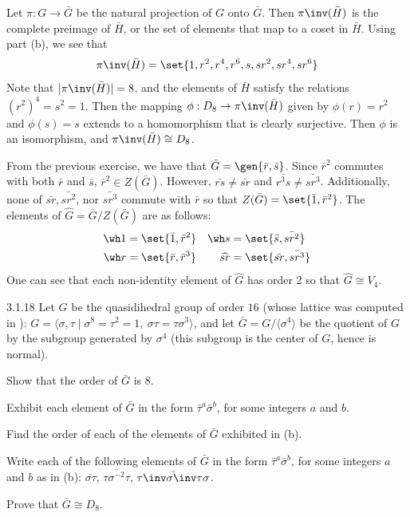 \begin{solenum}
    Let $\pi : G \to \bar G$ be the natural projection of $G$ onto $\bar G$.
	Then $\pi\inv(\bar H)$ is the complete preimage of $\bar H$, or the set of elements that map to a coset in $\bar H$.
	Using part (b), we see that
    \[
    	\pi\inv(\bar H) = \set{1, r^2, r^4, r^6, s, sr^2, sr^4, sr^6}
    \]
    Note that $|\pi\inv(\bar H)| = 8$, and the elements of $\bar H$ satisfy the relations $(r^2)^4 = s^2 = 1$.
	Then the mapping $\phi : D_8 \to \pi\inv(\bar H)$ given by $\phi(r) = r^2$ and $\phi(s) = s$ extends to a homomorphism that is clearly surjective.
	Then $\phi$ is an isomorphism, and $\pi\inv(\bar H) \cong D_8$.
    \item From the previous exercise, we have that $\bar G = \gen{\bar r, \bar s}$.
	Since $\bar r^2$ commutes with both $\bar r$ and $\bar s$, $\bar r^2 \in Z(\bar G)$.
	However, $\bar{rs} \neq \bar{sr}$ and $\bar{r^3s} \neq \bar{sr^3}$.
	Additionally, none of $\bar{sr}, \bar{sr^2}$, nor $\bar{sr^3}$ commute with $\bar r$ so that $Z(\bar G) = \set{\bar 1, \bar r^2}$.
	The elements of $\widehat G = \bar G/Z(\bar G)$ are as follows:
    \begin{align*}
        \wh 1 & = \set{\bar 1, \bar r^2} & \wh s & = \set{\bar s, \bar{sr^2}} \\
        \wh r & = \set{\bar r, \bar r^3} & \widehat{sr} & = \set{\bar{sr}, \bar{sr^3}}
    \end{align*}
    One can see that each non-identity element of $\widehat G$ has order 2 so that $\widehat G \cong V_4$.
\end{solenum}

\begin{exercise}{3.1.18}
    Let $G$ be the quasidihedral group of order $16$ (whose lattice was computed in ): $G = \langle \sigma,\tau \mid \sigma^8 = \tau^2 = 1,\ \sigma\tau = \tau\sigma^3 \rangle$, and let $\bar{G} = G/\langle \sigma^4 \rangle$ be the quotient of $G$ by the subgroup generated by $\sigma^4$ (this subgroup is the center of $G$, hence is normal).
    \begin{subexercises}
        \item Show that the order of $\bar{G}$ is $8$.
        \item Exhibit each element of $\bar{G}$ in the form $\bar{\tau}^a \bar{\sigma}^b$, for some integers $a$ and $b$.
        \item Find the order of each of the elements of $\bar{G}$ exhibited in (b).
        \item Write each of the following elements of $\bar{G}$ in the form $\bar{\tau}^a \bar{\sigma}^b$, for some integers $a$ and $b$ as in (b): $\bar{\sigma\tau}$, $\bar{\tau\sigma^{-2}\tau}$, $\bar{\tau\inv \sigma\inv \tau\sigma}$.
        \item Prove that $\bar{G} \cong D_8$.
    \end{subexercises}
\end{exercise}

